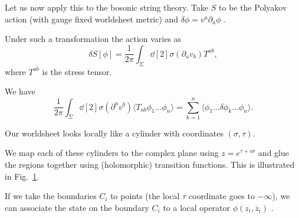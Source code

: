 
Let us now apply this to the bosonic string theory.
Take $S$ to be the Polyakov action (with gauge fixed worldsheet metric) and $\delta \phi= v^{a} \partial_{a} \phi$ .
\begin{exercise}
  Under such a transformation the action varies as
  \begin{equation}
    \delta S[\phi] = \frac{1}{2\pi} \int_{\Sigma} \dd[2]{\sigma} (\partial_a v_b) T^{ab},
  \end{equation}
  where $T^{ab}$ is the stress tensor.
\end{exercise}
We have
\begin{equation}
  \frac{1}{2\pi} \int_{\Sigma} \dd[2]{\sigma} (\partial^{a} v^{b}) \langle T_{ab} \phi_1 \dots \phi_n \rangle = \sum_{k=1}^{n} \langle \phi_1 \dots \delta \phi_k \dots \phi_n \rangle.
\end{equation}

Our worldsheet looks locally like a cylinder with coordinates $(\sigma, \tau)$.
\begin{figure}[tbhp]
  \centering
  \def\svgwidth{0.8\columnwidth}
  
  \caption{}
  \label{fig:l12f1}
\end{figure}
We map each of these cylinders to the complex plane using $z = e^{\tau +i \sigma}$  and glue the regions together using (holomorphic) transition functions. This is illustrated in Fig.~\ref{fig:l12f1}.

If we take the boundaries $C_i$ to points  (the local $\tau$ coordinate goes to $-\infty$), we can associate the state on the boundary $C_i$ to a local operator  $\phi(z_i, \overline{z}{}_i)$ .

